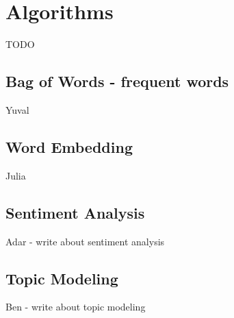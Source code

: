 \section{Algorithms}
TODO


\subsection{Bag of Words - frequent words}
Yuval

\subsection{Word Embedding}
Julia

\subsection{Sentiment Analysis}
Adar - write about sentiment analysis

\subsection{Topic Modeling}
Ben - write about topic modeling